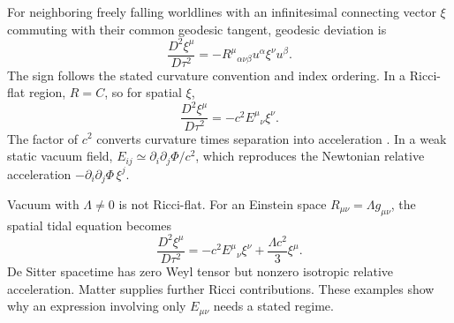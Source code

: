 \documentclass[11pt,oneside]{report}
\newcommand{\Ph}{\Phi}
\theoremstyle{remark}
\numberwithin{definition}{chapter}
\numberwithin{proposition}{chapter}
\numberwithin{remark}{chapter}
\begin{document}
For neighboring freely falling worldlines with an infinitesimal connecting vector $\xi$ commuting with their common geodesic tangent, geodesic deviation is
\begin{equation}
\frac{D^2\xi^\mu}{D\tau^2}
=-R^\mu{}_{\alpha\nu\beta}u^\alpha\xi^\nu u^\beta.
\label{geometry:eq:geodesicdeviation}
\end{equation}
The sign follows the stated curvature convention and index ordering. In a Ricci-flat region, $R=C$, so for spatial $\xi$,
\begin{equation}
\boxed{\frac{D^2\xi^\mu}{D\tau^2}=-c^2E^\mu{}_{\nu}\xi^\nu.}
\end{equation}
The factor of $c^2$ converts curvature times separation into acceleration \parencite{Carroll1997}. In a weak static vacuum field, $E_{ij}\simeq\partial_i\partial_j\Ph/c^2$, which reproduces the Newtonian relative acceleration $-\partial_i\partial_j\Ph\,\xi^j$.

Vacuum with $\Lambda\ne0$ is not Ricci-flat. For an Einstein space $R_{\mu\nu}=\Lambda g_{\mu\nu}$, the spatial tidal equation becomes
\begin{equation}
\frac{D^2\xi^\mu}{D\tau^2}
=-c^2E^\mu{}_{\nu}\xi^\nu+\frac{\Lambda c^2}{3}\xi^\mu.
\end{equation}
De Sitter spacetime has zero Weyl tensor but nonzero isotropic relative acceleration. Matter supplies further Ricci contributions. These examples show why an expression involving only $E_{\mu\nu}$ needs a stated regime.
\end{document}
